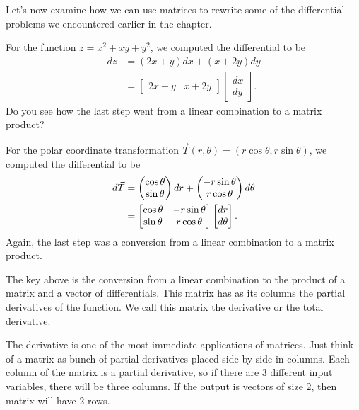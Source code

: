 Let's now examine how we can use matrices to rewrite some of the differential problems we encountered earlier in the chapter.  



\begin{example}\label{total derivative example}
For the function $z = x^2+xy+y^2$, we computed the differential to be 
\begin{align*}
 dz &= (2x+y)dx+(x+2y)dy \\
&= \begin{bmatrix}2x+y&x+2y\end{bmatrix}\begin{bmatrix}dx\\dy\end{bmatrix}.
\end{align*}
Do you see how the last step went from a linear combination to a matrix product?


For the polar coordinate transformation $\vec T(r,\theta) = (r\cos\theta,r\sin\theta)$, we computed the differential to be
\begin{align*}
d\vec T &=
\begin{pmatrix}
 \cos\theta\\
 \sin\theta
\end{pmatrix}
dr+ 
\begin{pmatrix}
 -r\sin\theta\\
 r\cos\theta
\end{pmatrix}
d\theta \\
&=
\begin{bmatrix} 
\begin{matrix} 
 \cos\theta\\
 \sin\theta
 \end{matrix}& 
\begin{matrix} 
 -r\sin\theta\\
 r\cos\theta
 \end{matrix}
\end{bmatrix}
\begin{bmatrix}
 dr\\
 d\theta
\end{bmatrix}.
\end{align*}
Again, the last step was a conversion from a linear combination to a matrix product. 

\end{example}


The key above is the conversion from a linear combination to the product of a matrix and a vector of differentials. This matrix has as its columns the partial derivatives of the function.
We call this matrix the derivative or the total derivative. 

The derivative is one of the most immediate applications of matrices. Just think of a matrix as bunch of partial derivatives placed side by side in columns. Each column of the matrix is a partial derivative, so if there are 3 different input variables, there will be three columns. If the output is vectors of size 2, then matrix will have 2 rows. 

